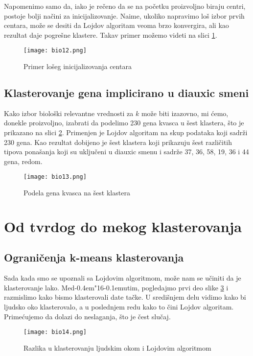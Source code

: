 \documentclass[a4paper]{book}
\def \dj {d\kern-0.4em\char"16\kern-0.1em}
\begin{document}
Napomenimo samo da, iako je rečeno da se na početku proizvoljno biraju centri, postoje bolji načini za inicijalizovanje. Naime, ukoliko napravimo loš izbor prvih centara, može se desiti da Lojdov algoritam veoma brzo konvergira, ali kao rezultat daje pogrešne klastere. Takav primer možemo videti na slici \ref{slika 12}.
\begin{figure}[h!]
    \centering
    \texttt{[image: bio12.png]}
    \caption{Primer lošeg inicijalizovanja centara}
    \label{slika 12}
\end{figure}


\subsection{Klasterovanje gena implicirano u diauxic smeni}

Kako izbor biološki relevantne vrednosti za $k$ može biti izazovno, mi ćemo, donekle proizvoljno, izabrati da podelimo 230 gena kvasca u šest klastera, što je prikazano na slici \ref{slika 13}. Primenjen je Lojdov algoritam na skup podataka koji sadrži 230 gena. Kao rezultat dobijeno je šest klastera koji prikazuju šest različitih tipova  ponašanja koji su uključeni u diauxic smenu i sadrže 37, 36, 58, 19, 36 i 44 gena, redom.
\begin{figure}[h!]
    \centering
    \texttt{[image: bio13.png]}
    \caption{Podela gena kvasca na šest klastera}
    \label{slika 13}
\end{figure}

\section{Od tvrdog do mekog klasterovanja}
\subsection{Ograničenja k-means klasterovanja}

Sada kada smo se upoznali sa Lojdovim algoritmom, može nam se učiniti da je klasterovanje lako. Me\dj utim, pogledajmo prvi deo slike \ref{slika 14} i razmislimo kako bismo klasterovali date tačke. U središnjem delu vidimo kako bi ljudsko oko klasterovalo, a u poslednjem redu kako to čini Lojdov algoritam. Primećujemo da dolazi do neslaganja, što je čest slučaj.
\begin{figure}[h!]
    \centering
    \texttt{[image: bio14.png]}
    \caption{Razlika u klasterovanju ljudskim okom i Lojdovim algoritmom}
    \label{slika 14}
\end{figure}
\end{document}
